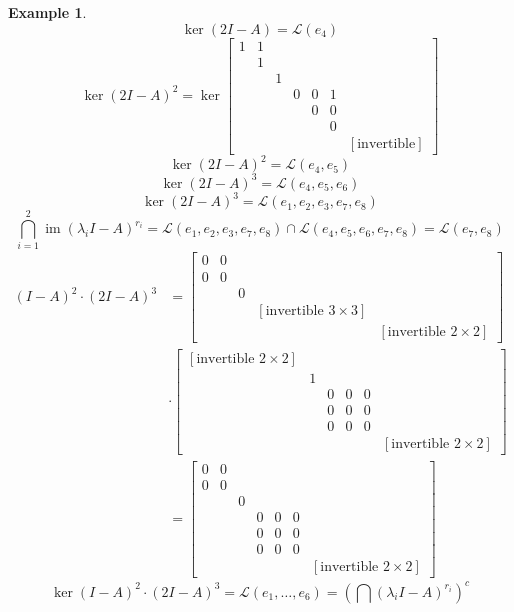 \documentclass[a4paper]{article}
\newcounter{lecref}[section]
\numberwithin{lecref}{section}
\newtheorem{example}[lecref]{Example}
\DeclareMathOperator{\im}{im}
\begin{document}
\begin{example}
\[  \] \[
    \ker(2I - A) = \mathcal L(e_{4})
  \] \[
    \ker(2I - A)^2 = \ker\begin{bmatrix}
      1 & 1  &   &    &    &    &     \\   %
        & 1  &   &    &    &    &     \\   %
        &    & 1 &    &    &    &     \\
        &    &   & 0  & 0  & 1  &     \\
        &    &   &    & 0  & 0  &     \\
        &    &   &    &    & 0  &     \\
        &    &   &    &    &    & [\text{invertible}]
    \end{bmatrix}
  \] \[
    \ker(2I - A)^2 = \mathcal L(e_4, e_5)
  \] \[
    \ker(2I - A)^3 = \mathcal L(e_4, e_5, e_6)
  \] \[
    \ker(2I - A)^3 = \mathcal L(e_1, e_2, e_3, e_7, e_8)
  \] \[
    \bigcap_{i=1}^2 \im(\lambda_i I - A)^{r_i} = \mathcal L(e_1, e_2, e_3, e_7, e_8) \cap \mathcal L(e_4, e_5, e_6, e_7, e_8) = \mathcal L(e_7, e_8)
  \]
  \begin{align*}
    (I - A)^2 \cdot (2I - A)^3 &= \begin{bmatrix}
      0 & 0 &   & & \\
      0 & 0 &   & & \\
        &   & 0 & & \\
        &   &   & [\text{invertible } 3 \times 3] & \\
        &   &   &       & [\text{invertible } 2 \times 2]
    \end{bmatrix} \\ &\cdot \begin{bmatrix}
      [\text{invertible } 2 \times 2] & & & & & \\
        & 1 &   &   &   & \\
        &   & 0 & 0 & 0 & \\
        &   & 0 & 0 & 0 & \\
        &   & 0 & 0 & 0 & \\
        &   &   &   &   & [\text{invertible } 2 \times 2]
    \end{bmatrix} \\ &= \begin{bmatrix}
      0 & 0 &   &   &   &   & \\
      0 & 0 &   &   &   &   & \\
        &   & 0 &   &   &   & \\
        &   &   & 0 & 0 & 0 & \\
        &   &   & 0 & 0 & 0 & \\
        &   &   & 0 & 0 & 0 & \\
        &   &   &   &   &   & [\text{invertible } 2\times 2]
    \end{bmatrix}
  \end{align*} \[
    \ker{(I - A)^2 \cdot (2I - A)^3} = \mathcal L(e_1, \dots, e_6) = \left(\bigcap (\lambda_i I - A)^{r_i}\right)^c
  \]
\end{example}
\end{document}
